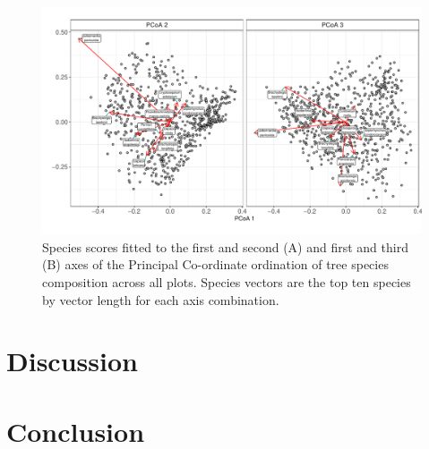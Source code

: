 \documentclass[11pt,a4paper]{article}
\begin{document}
\begin{figure}[H]
\centering
	\includegraphics[width=\textwidth]{pcoa.pdf}
	\caption{Species scores fitted to the first and second (A) and first and third (B) axes of the Principal Co-ordinate ordination of tree species composition across all plots. Species vectors are the top ten species by vector length for each axis combination.}
	\label{pcoa}
\end{figure}

\section{Discussion}

\section{Conclusion}


\end{document}

